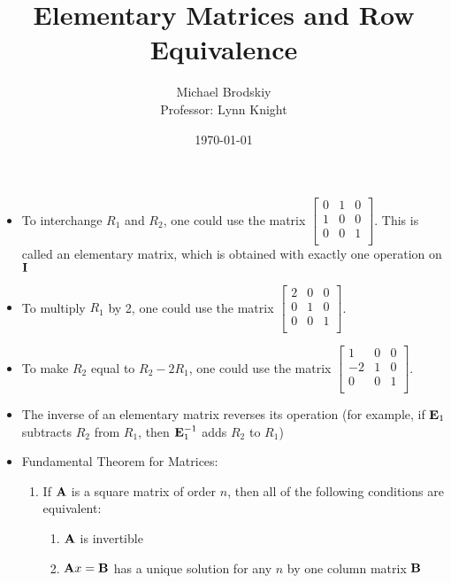 \documentclass[12pt]{article}
\title{Elementary Matrices and Row Equivalence}
\date{\today}
\author{Michael Brodskiy\\ \small Professor: Lynn Knight}
\begin{document}
\maketitle

\begin{itemize}

  \item To interchange $R_1$ and $R_2$, one could use the matrix $\begin{bmatrix} 0 & 1 & 0\\ 1 & 0 & 0 \\ 0 & 0 & 1\\  \end{bmatrix}$. This is called an elementary matrix, which is obtained with exactly one operation on $\bold{I}$

  \item To multiply $R_1$ by 2, one could use the matrix $\begin{bmatrix} 2 & 0 & 0\\ 0 & 1 & 0 \\ 0 & 0 & 1\\  \end{bmatrix}$.
    
  \item To make $R_2$ equal to $R_2-2R_1$, one could use the matrix $\begin{bmatrix} 1 & 0 & 0\\ -2 & 1 & 0 \\ 0 & 0 & 1\\  \end{bmatrix}$.

  \item The inverse of an elementary matrix reverses its operation (for example, if $\bold{E}_1$ subtracts $R_2$ from $R_1$, then $\bold{E}_1^{-1}$ adds $R_2$ to $R_1$)

  \item Fundamental Theorem for Matrices:

    \begin{enumerate}

      \item If $\bold{A}$ is a square matrix of order $n$, then all of the following conditions are equivalent:

        \begin{enumerate}

          \item $\bold{A}$ is invertible

          \item $\bold{A}x=\bold{B}$ has a unique solution for any $n$ by one column matrix $\bold{B}$


\end{enumerate}
\end{enumerate}
\end{itemize}
\end{document}
